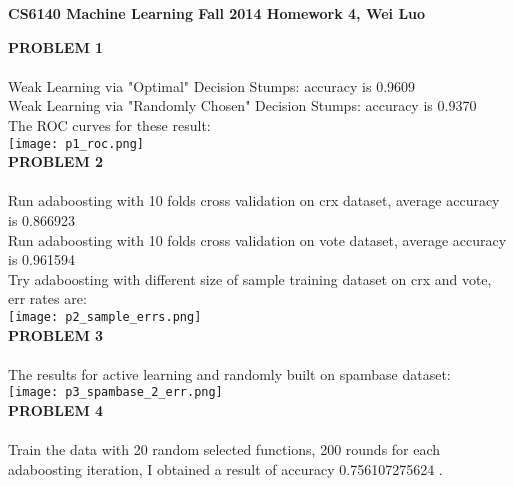 \documentclass[11pt,a4paper,fleqn]{article}
\begin{document}
\begin{center}
\textbf{CS6140 Machine Learning Fall 2014 Homework 4, Wei Luo }\\
\end{center}
\textbf{PROBLEM 1}\\
\\
Weak Learning via "Optimal" Decision Stumps: accuracy is 0.9609\\
Weak Learning via "Randomly Chosen" Decision Stumps: accuracy is 0.9370\\
The ROC curves for these result:\\
\texttt{[image: p1\_roc.png]}\\
\textbf{PROBLEM 2}\\
\\
Run adaboosting with 10 folds cross validation on crx dataset, average accuracy is 0.866923\\
Run adaboosting with 10 folds cross validation on vote dataset, average accuracy is 0.961594\\
Try adaboosting with different size of sample training dataset on crx and vote, err rates are:\\
\texttt{[image: p2\_sample\_errs.png]}\\
\newpage \noindent
\textbf{PROBLEM 3}\\
\\
The results for active learning and randomly built on spambase dataset:\\
\texttt{[image: p3\_spambase\_2\_err.png]}\\
\textbf{PROBLEM 4}\\
\\
Train the data with 20 random selected functions, 200 rounds for each adaboosting iteration, I obtained a result of accuracy 0.756107275624 .\\
\end{document}
